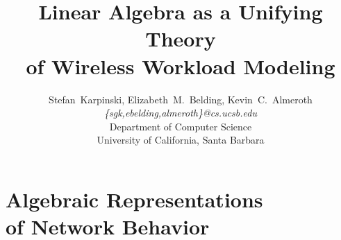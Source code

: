 \documentclass[conference]{IEEEtran}
\title{Linear Algebra as a Unifying Theory\\of Wireless Workload Modeling}
\author{
{\large{Stefan~Karpinski, Elizabeth~M.~Belding, Kevin~C.~Almeroth}}\\
\textit{\{sgk,ebelding,almeroth\}@cs.ucsb.edu}\vspace{0.5em}\\
Department of Computer Science\\
University of California, Santa Barbara
\vspace{-0.5em}
}
\newcommand{\caps}[1]{{\small{#1}}}
\begin{document}
\maketitle

%

\section{Algebraic Representations \\of Network Behavior}

\end{document}
